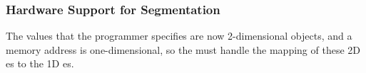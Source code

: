 \subsubsection{Hardware Support for Segmentation}\label{subsubsec:Segmentation_Hardware_Support}
The values that the programmer specifies are now 2-dimensional objects, and a memory address is one-dimensional, so the  must handle the mapping of these 2D es to the 1D es.

